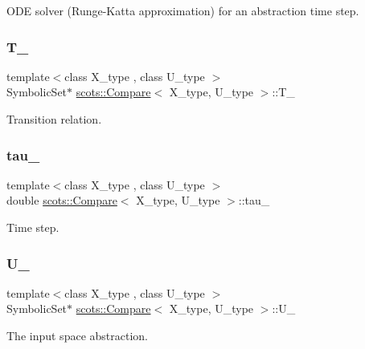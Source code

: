 O\+DE solver (Runge-\/\+Katta approximation) for an abstraction time step. \mbox{\label{classscots_1_1Compare_aeb0830d94286ae12672cf1ea183afb1d}} 
\subsubsection{\texorpdfstring{T\+\_\+}{T\_}}
{\footnotesize\ttfamily template$<$class X\+\_\+type , class U\+\_\+type $>$ \\
Symbolic\+Set$\ast$ \hyperlink{classscots_1_1Compare}{scots\+::\+Compare}$<$ X\+\_\+type, U\+\_\+type $>$\+::T\+\_\+}

Transition relation. \mbox{\label{classscots_1_1Compare_a1746834841252ede3651c0f5bfc3e27f}} 
\subsubsection{\texorpdfstring{tau\+\_\+}{tau\_}}
{\footnotesize\ttfamily template$<$class X\+\_\+type , class U\+\_\+type $>$ \\
double \hyperlink{classscots_1_1Compare}{scots\+::\+Compare}$<$ X\+\_\+type, U\+\_\+type $>$\+::tau\+\_\+}

Time step. \mbox{\label{classscots_1_1Compare_ac341e6c2534e4bb4ab248cc767c33b8d}} 
\subsubsection{\texorpdfstring{U\+\_\+}{U\_}}
{\footnotesize\ttfamily template$<$class X\+\_\+type , class U\+\_\+type $>$ \\
Symbolic\+Set$\ast$ \hyperlink{classscots_1_1Compare}{scots\+::\+Compare}$<$ X\+\_\+type, U\+\_\+type $>$\+::U\+\_\+}

The input space abstraction. \mbox{\label{classscots_1_1Compare_a0b0e2f9dd8e872f49eb2a190d9e09dff}} 
